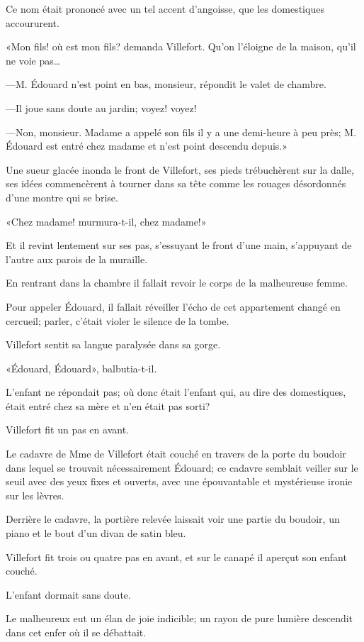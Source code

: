 Ce nom était prononcé avec un tel accent d'angoisse, que les domestiques accoururent. 

«Mon fils! où est mon fils? demanda Villefort. Qu'on l'éloigne de la maison, qu'il ne voie pas\dots 

—M. Édouard n'est point en bas, monsieur, répondit le valet de chambre. 

—Il joue sans doute au jardin; voyez! voyez! 

—Non, monsieur. Madame a appelé son fils il y a une demi-heure à peu près; M. Édouard est entré chez madame et n'est point descendu depuis.» 

Une sueur glacée inonda le front de Villefort, ses pieds trébuchèrent sur la dalle, ses idées commencèrent à tourner dans sa tête comme les rouages désordonnés d'une montre qui se brise. 

«Chez madame! murmura-t-il, chez madame!» 

Et il revint lentement sur ses pas, s'essuyant le front d'une main, s'appuyant de l'autre aux parois de la muraille. 

En rentrant dans la chambre il fallait revoir le corps de la malheureuse femme. 

Pour appeler Édouard, il fallait réveiller l'écho de cet appartement changé en cercueil; parler, c'était violer le silence de la tombe. 

Villefort sentit sa langue paralysée dans sa gorge. 

«Édouard, Édouard», balbutia-t-il. 

L'enfant ne répondait pas; où donc était l'enfant qui, au dire des domestiques, était entré chez sa mère et n'en était pas sorti? 

Villefort fit un pas en avant. 

Le cadavre de Mme de Villefort était couché en travers de la porte du boudoir dans lequel se trouvait nécessairement Édouard; ce cadavre semblait veiller sur le seuil avec des yeux fixes et ouverts, avec une épouvantable et mystérieuse ironie sur les lèvres. 

Derrière le cadavre, la portière relevée laissait voir une partie du boudoir, un piano et le bout d'un divan de satin bleu. 

Villefort fit trois ou quatre pas en avant, et sur le canapé il aperçut son enfant couché. 

L'enfant dormait sans doute. 

Le malheureux eut un élan de joie indicible; un rayon de pure lumière descendit dans cet enfer où il se débattait. 

